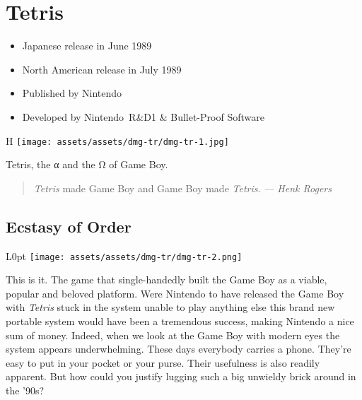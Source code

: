 \documentclass{book}
\begin{document}
\begingroup \chapter*{Tetris} \endgroup

\begin{itemize} \setlength\itemsep{-0.4em}
\item Japanese release in June 1989
\item North American release in July 1989
\item Published by Nintendo
\item Developed by Nintendo R\&D1 \& Bullet-Proof Software
\end{itemize}\noindent

\begin{wrapfigure}{H}{\linewidth}
\vskip 4pt
\centering \texttt{[image: assets/assets/dmg-tr/dmg-tr-1.jpg]}\par\pagetwodescription Tetris, the α and the Ω of Game Boy.\end{wrapfigure}
\clearpage

\begin{quote}\emph{Tetris} made Game Boy and Game Boy made \emph{Tetris}.\newline \emph{ — Henk Rogers}\end{quote} \par

\FloatBarrier\needspace{5pt}\section*{Ecstasy of Order}\nopagebreak[4]

\begin{wrapfigure}{L}{0pt} \texttt{[image: assets/assets/dmg-tr/dmg-tr-2.png]}\end{wrapfigure}
This is it. The game that single-handedly built the Game Boy as a viable, popular and beloved platform. Were Nintendo to have released the Game Boy with \emph{Tetris} stuck in the system unable to play anything else this brand new portable system would have been a tremendous success, making Nintendo a nice sum of money. Indeed, when we look at the Game Boy with modern eyes the system appears underwhelming. These days everybody carries a phone. They’re easy to put in your pocket or your purse. Their usefulness is also readily apparent. But how could you justify lugging such a big unwieldy brick around in the ’90s?
\end{document}
